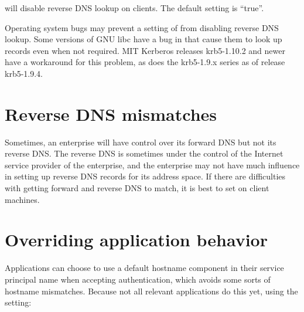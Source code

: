 \documentclass[letterpaper,10pt,english]{sphinxmanual}
\begin{document}
%
\begin{sphinxVerbatim}[commandchars=\\\{\}]
\PYG{p}{[}\PYG{p}{]}
      
\end{sphinxVerbatim}

will disable reverse DNS lookup on clients.  The default setting is
“true”.

Operating system bugs may prevent a setting of  from
disabling reverse DNS lookup.  Some versions of GNU libc have a bug in
 that cause them to look up  records even when
not required.  MIT Kerberos releases krb5-1.10.2 and newer have a
workaround for this problem, as does the krb5-1.9.x series as of
release krb5-1.9.4.


\section{Reverse DNS mismatches}
\label{\detokenize{admin/princ_dns:reverse-dns-mismatches}}
Sometimes, an enterprise will have control over its forward DNS but
not its reverse DNS.  The reverse DNS is sometimes under the control
of the Internet service provider of the enterprise, and the enterprise
may not have much influence in setting up reverse DNS records for its
address space.  If there are difficulties with getting forward and
reverse DNS to match, it is best to set  on client
machines.


\section{Overriding application behavior}
\label{\detokenize{admin/princ_dns:overriding-application-behavior}}
Applications can choose to use a default hostname component in their
service principal name when accepting authentication, which avoids
some sorts of hostname mismatches.  Because not all relevant
applications do this yet, using the {\hyperref[\detokenize{admin/conf_files/krb5_conf:krb5-conf-5}]{}} setting:

%
\begin{sphinxVerbatim}[commandchars=\\\{\}]
\PYG{p}{[}\PYG{p}{]}
      
\end{sphinxVerbatim}
\end{document}
